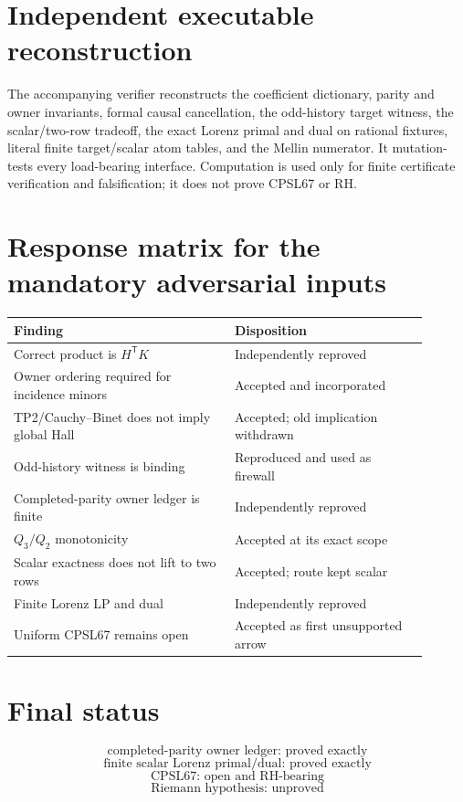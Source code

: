 \documentclass[11pt]{article}
\newcommand{\1}{\mathbf 1}
\begin{document}
\section{Independent executable reconstruction}

The accompanying verifier reconstructs the coefficient dictionary, parity and owner invariants, formal causal cancellation, the odd-history target witness, the scalar/two-row tradeoff, the exact Lorenz primal and dual on rational fixtures, literal finite target/scalar atom tables, and the Mellin numerator. It mutation-tests every load-bearing interface. Computation is used only for finite certificate verification and falsification; it does not prove CPSL67 or RH.

\section{Response matrix for the mandatory adversarial inputs}

\begin{center}
\begin{tabular}{p{0.48\linewidth}p{0.42\linewidth}}
\toprule
Finding & Disposition\\
\midrule
Correct product is $H^{\mathsf T}K$ & Independently reproved\\
Owner ordering required for incidence minors & Accepted and incorporated\\
TP2/Cauchy--Binet does not imply global Hall & Accepted; old implication withdrawn\\
Odd-history witness is binding & Reproduced and used as firewall\\
Completed-parity owner ledger is finite & Independently reproved\\
$Q_3/Q_2$ monotonicity & Accepted at its exact scope\\
Scalar exactness does not lift to two rows & Accepted; route kept scalar\\
Finite Lorenz LP and dual & Independently reproved\\
Uniform CPSL67 remains open & Accepted as first unsupported arrow\\
\bottomrule
\end{tabular}
\end{center}

\section{Final status}

\[
\boxed{\text{completed-parity owner ledger: proved exactly}}
\]
\[
\boxed{\text{finite scalar Lorenz primal/dual: proved exactly}}
\]
\[
\boxed{\text{CPSL67: open and RH-bearing}}
\]
\[
\boxed{\text{Riemann hypothesis: unproved}}
\]



\end{document}
